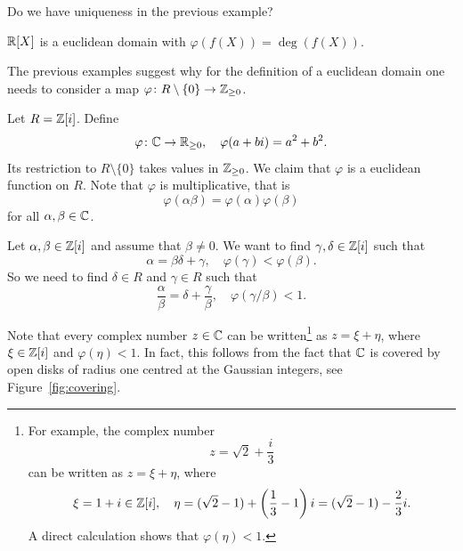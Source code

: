 Do we have uniqueness in the previous example? 	

\begin{example}
	$\mathbb{R}[X]$ is a euclidean domain with $\varphi(f(X))=\deg(f(X))$. 	
\end{example}

The previous examples suggest why for the definition of a euclidean domain one needs to  
consider a map $\varphi\colon R\setminus\{0\}\to\mathbb{Z}_{\geq0}$. 

\begin{example}
  Let $R=\mathbb{Z}[i]$. Define
  \[
    \varphi\colon\mathbb{C}\to\mathbb{R}_{\geq0},\quad
    \varphi(a+bi)=a^2+b^2.
  \]
  Its restriction to $R\setminus\{0\}$ takes values in $\mathbb{Z}_{\geq0}$. 
  We claim that $\varphi$ is a euclidean function on $R$. Note that 
  $\varphi$ is multiplicative, 
  that is
  \[
    \varphi(\alpha\beta)=\varphi(\alpha)\varphi(\beta)
  \]
  for all $\alpha,\beta\in\mathbb{C}$. 

 	Let $\alpha,\beta\in\mathbb{Z}[i]$ and assume that $\beta\ne0$. 
	We want to find $\gamma,\delta\in\mathbb{Z}[i]$ such that 
	\[
        \alpha=\beta\delta+\gamma,\quad 
        \varphi(\gamma)<\varphi(\beta).
	\]
    So we need to find $\delta\in R$ and $\gamma\in R$ such that 
    \[
    \frac{\alpha}{\beta}=\delta+\frac{\gamma}{\beta},
    \quad 
    \varphi(\gamma/\beta)<1. 
    \]

    
    Note that every complex
	number $z\in\mathbb{C}$ can be written\footnote{For example, 
    the complex number 
    \[
    z=\sqrt{2}+\frac{i}{3}
    \]
    can be written as 
    $z=\xi+\eta$, where 
    \[
    \xi=1+i\in\mathbb{Z}[i],\quad 
    \eta=(\sqrt{2}-1)+\left(\frac13-1\right)i=(\sqrt{2}-1)-\frac23i. 
    \]
    A direct calculation shows that $\varphi(\eta)<1$.} 
    as $z=\xi+\eta$, where $\xi\in\mathbb{Z}[i]$ and $\varphi(\eta)<1$. In fact, 
    this
	follows from the fact that 
	$\mathbb{C}$ is covered by 
  open disks of radius one centred at the Gaussian integers, 
  see Figure~\ref{fig:covering}.


\end{example}
